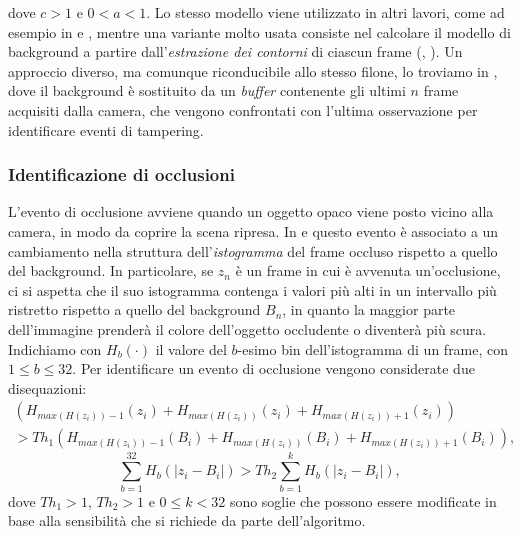   dove $c > 1$ e $0<a<1$.
  Lo stesso modello viene utilizzato in altri lavori, come ad esempio in \cite{saglam2009real} e \cite{tsesmelis2013tamper}, mentre una variante molto usata consiste nel calcolare il modello di background a partire dall'\textit{estrazione dei contorni} di ciascun frame (\cite{harasse2004automated}, \cite{gil2007automatic}).
  Un approccio diverso, ma comunque riconducibile allo stesso filone, lo troviamo in \cite{ribnick2006real}, dove il background \`e sostituito da un \textit{buffer} contenente gli ultimi $n$ frame acquisiti dalla camera, che vengono confrontati con l'ultima osservazione per identificare eventi di tampering.
\subsubsection{Identificazione di occlusioni}
L'evento di occlusione avviene quando un oggetto opaco viene posto vicino alla camera, in modo da coprire la scena ripresa.
In \cite{aksay2007camera} e \cite{saglam2009real} questo evento \`e associato a un cambiamento nella struttura dell'\textit{istogramma} del frame occluso rispetto a quello del background.
In particolare, se $z_n$ \`e un frame in cui \`e avvenuta un'occlusione, ci si aspetta che il suo istogramma contenga i valori pi\`u alti in un intervallo pi\`u ristretto rispetto a quello del background $B_n$, in quanto la maggior parte dell'immagine prender\`a il colore dell'oggetto occludente o diventer\`a pi\`u scura.\\
Indichiamo con $H_b(\cdot)$ il valore del $b$-esimo bin dell'istogramma di un frame, con $1 \leq b \leq 32$.
Per identificare un evento di occlusione vengono considerate due disequazioni:
\begin{eqnarray}
 \left(H_{max\left(H(z_i)\right)-1}(z_i) + H_{max\left(H(z_i)\right)}(z_i) +  H_{max\left(H(z_i)\right) + 1}(z_i)\right) \nonumber \\
 > Th_1 \left(H_{max\left(H(z_i)\right)-1}(B_i) + H_{max\left(H(z_i)\right)}(B_i)
  +  H_{max\left(H(z_i)\right) + 1}(B_i)\right), \nonumber
\end{eqnarray}
\[ \sum_{b=1}^{32} H_b\left(|z_i - B_i|\right) > Th_2 \sum_{b=1}^{k}H_b\left(|z_i - B_i|\right),\]
dove $Th_1 > 1$, $Th_2 > 1$ e $0 \leq k < 32$ sono soglie che possono essere modificate in base alla sensibilit\`a che si richiede da parte dell'algoritmo.\\
